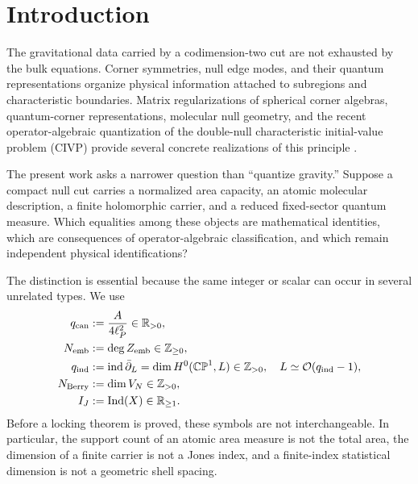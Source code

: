 \documentclass[aps,prd,preprint,nofootinbib,superscriptaddress]{revtex4-2}
\theoremstyle{definition}
\theoremstyle{remark}
\newcommand{\Ind}{\operatorname{Ind}}
\newcommand{\UV}{\mathrm{UV}}
\newcommand{\cI}{\mathfrak I}
\newcommand{\cO}{\mathcal O}
\newcommand{\ind}{\operatorname{ind}}
\newcommand{\CP}{\mathbb{CP}}
\begin{document}
\begin{abstract}
Finally, a positive primitive sequence $\cI_q^{\UV}$ derived from one reduced molecular measure defines the selector.  Its second logarithmic difference is the complete invariant modulo affine sector reweighting; strict discrete convexity and one adjacent sign change give a unique sector, while topology-dependent Casimir deformations admit exact stability bounds.  Finite-index entropy enters additively: a possible physical bridge is $\Delta S_{\rm gen}=\log\Ind$, not $\Delta\log Q=\log\Ind$.  The resulting de Sitter map is purely kinematic until the five independent physical certificates identified in the paper are derived.
\end{abstract}

\maketitle

\section{Introduction}
\label{sec:intro}

The gravitational data carried by a codimension-two cut are not exhausted by the bulk equations.  Corner symmetries, null edge modes, and their quantum representations organize physical information attached to subregions and characteristic boundaries.  Matrix regularizations of spherical corner algebras, quantum-corner representations, molecular null geometry, and the recent operator-algebraic quantization of the double-null characteristic initial-value problem (CIVP) provide several concrete realizations of this principle \cite{FreidelGeillerPranzetti2020,DonnellyFreidelMoosavianSperanza2023,CiambelliKowalskiVarrin2025,CiambelliFreidelLeigh2024,CiambelliKlinger2026}.

The present work asks a narrower question than ``quantize gravity.''  Suppose a compact null cut carries a normalized area capacity, an atomic molecular description, a finite holomorphic carrier, and a reduced fixed-sector quantum measure.  Which equalities among these objects are mathematical identities, which are consequences of operator-algebraic classification, and which remain independent physical identifications?

The distinction is essential because the same integer or scalar can occur in several unrelated types.  We use
\begin{align}
q_{\rm can} &:= \frac{A}{4\ell_P^2}\in\mathbb R_{>0},
\\
N_{\rm emb} &:= \deg Z_{\rm emb}\in\mathbb Z_{\ge0},
\\
q_{\rm ind} &:= \ind\bar\partial_L=\dim H^0(\CP^1,L)\in\mathbb Z_{>0},
\quad L\simeq\cO(q_{\rm ind}-1),
\\
N_{\rm Berry} &:= \dim V_N\in\mathbb Z_{>0},
\\
I_J &:= \Ind(X)\in\mathbb R_{\ge1}.
\end{align}
Before a locking theorem is proved, these symbols are not interchangeable.  In particular, the support count of an atomic area measure is not the total area, the dimension of a finite carrier is not a Jones index, and a finite-index statistical dimension is not a geometric shell spacing.
\end{document}
